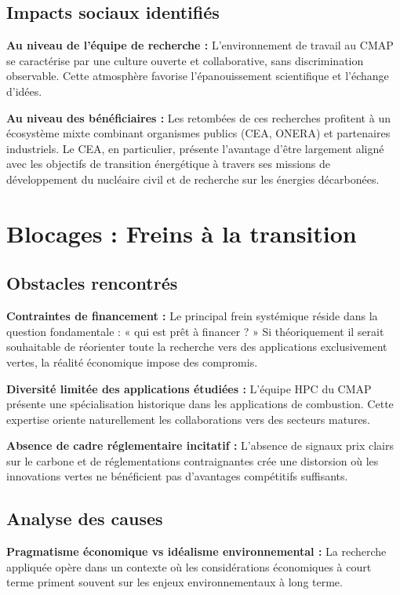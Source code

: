 \documentclass[11pt,a4paper]{article}
\begin{document}
\subsection{Impacts sociaux identifiés}

\textbf{Au niveau de l'équipe de recherche :} L'environnement de travail au CMAP se caractérise par une culture ouverte et collaborative, sans discrimination observable. Cette atmosphère favorise l'épanouissement scientifique et l'échange d'idées.

\textbf{Au niveau des bénéficiaires :} Les retombées de ces recherches profitent à un écosystème mixte combinant organismes publics (CEA, ONERA) et partenaires industriels. Le CEA, en particulier, présente l'avantage d'être largement aligné avec les objectifs de transition énergétique à travers ses missions de développement du nucléaire civil et de recherche sur les énergies décarbonées.

\section{Blocages : Freins à la transition}

\subsection{Obstacles rencontrés}

\textbf{Contraintes de financement :} Le principal frein systémique réside dans la question fondamentale : « qui est prêt à financer ? » Si théoriquement il serait souhaitable de réorienter toute la recherche vers des applications exclusivement vertes, la réalité économique impose des compromis.

\textbf{Diversité limitée des applications étudiées :} L’équipe HPC du CMAP présente une spécialisation historique dans les applications de combustion. Cette expertise oriente naturellement les collaborations vers des secteurs matures.

\textbf{Absence de cadre réglementaire incitatif :} L'absence de signaux prix clairs sur le carbone et de réglementations contraignantes crée une distorsion où les innovations vertes ne bénéficient pas d'avantages compétitifs suffisants.

\subsection{Analyse des causes}

\textbf{Pragmatisme économique vs idéalisme environnemental :} La recherche appliquée opère dans un contexte où les considérations économiques à court terme priment souvent sur les enjeux environnementaux à long terme.
\end{document}
